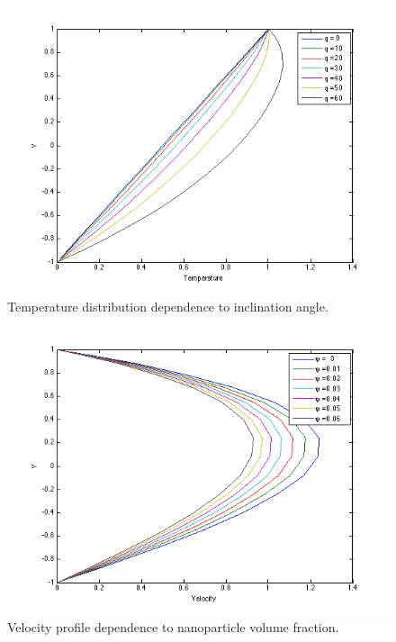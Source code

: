 \begin{figure}
\begin{center}
\includegraphics[scale=0.75]{figures/tempIncAngDep.png}
\end{center}
\caption{Temperature distribution dependence to inclination angle.}
\label{tempincAngDep} 
\end{figure}

\begin{figure}[t]
\begin{center}
\includegraphics[scale=0.75]{figures/velConcentrationDep.png}
\end{center}
\caption{Velocity profile dependence to nanoparticle volume fraction.}
\label{velConcentrationDep} 
\end{figure}


